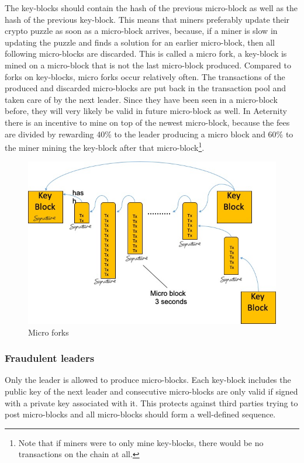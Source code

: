 The key-blocks should contain the hash of the previous micro-block as
well as the hash of the previous key-block. This means that miners
preferably update their crypto puzzle as soon as a micro-block
arrives, because, if a miner is slow in updating the puzzle and finds a solution for an earlier
micro-block, then all following micro-blocks are discarded. This is
called a micro fork, a key-block is mined on a micro-block that is not
the last micro-block produced. Compared to forks on key-blocks,
micro forks occur relatively often. The
transactions of the produced and discarded micro-blocks are put back in the
transaction pool and taken care of by the next leader. Since they have
been seen in a micro-block before, they will very likely be valid in
future micro-block as well. In Aeternity there is an incentive to mine
on top of the newest micro-block, because the fees are divided by rewarding 40\%
to the leader producing a micro block and 60\% to the miner mining the key-block after that
micro-block\footnote{Note that if miners
  were to only mine key-blocks, there would be no transactions on the
  chain at all.}.

\begin{figure}
   \includegraphics[scale=0.5]{keymicro.jpg}
  \caption{Micro forks}
\end{figure}

\subsubsection{Fraudulent leaders}

Only the leader is allowed to produce micro-blocks. Each key-block
includes the public key of the next leader and consecutive micro-blocks are only valid
if signed with a private key associated with it. This protects against third parties trying
to post micro-blocks and all micro-blocks should form a well-defined
sequence.

